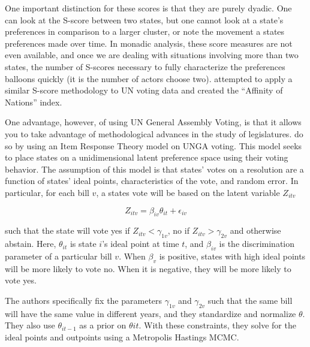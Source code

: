 One important distinction for these scores is that they are purely dyadic. One can look at the S-score between two states, but one cannot look at a state's preferences in comparison to a larger cluster, or note the movement a states preferences made over time. In monadic analysis, these score measures are not even available, and once we are dealing with situations involving more than two states, the number of S-scores necessary to fully characterize the preferences balloons quickly (it is the number of actors choose two). \citet{gartzke:1998} attempted to apply a similar S-score methodology to UN voting data and created the ``Affinity of Nations'' index.

One advantage, however, of using UN General Assembly Voting, is that it allows you to take advantage of methodological advances in the study of legislatures. \citet{bailey:etal:2015} do so by using an Item Response Theory model on UNGA voting. This model seeks to place states on a unidimensional latent preference space using their voting behavior. The assumption of this model is that states' votes on a resolution are a function of states' ideal points, characteristics of the vote, and random error. In particular, for each bill $v$, a states vote will be based on the latent variable $Z_{itv}$

\begin{equation}
	Z_{itv} = \beta_{iv}\theta_{it} + \epsilon_{iv}
\end{equation}

such that the state will vote yes if $Z_{itv} < \gamma_{1v}$, no if $Z_{itv} > \gamma_{2v}$ and otherwise abstain. Here, $\theta_{it}$ is state $i$'s ideal point at time $t$, and $\beta_{iv}$ is the discrimination parameter of a particular bill $v$. When $\beta_{v}$ is positive, states with high ideal points will be more likely to vote no. When it is negative, they will be more likely to vote yes.

The authors specifically fix the parameters $\gamma_{1v}$ and $\gamma_{2v}$ such that the same bill will have the same value in different years, and they standardize and normalize $\theta$. They also use $\theta_{it-1}$ as a prior on $\theta{it}$. With these constraints, they solve for the ideal points and outpoints using a Metropolis Hastings MCMC.

